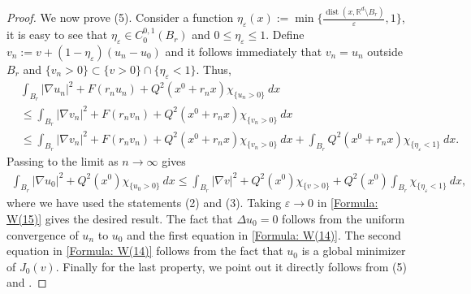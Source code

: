 \documentclass[11pt,reqno]{amsart}
\begin{document}
\begin{proof}
    We now prove (5). Consider a function $\eta_{\varepsilon}(x):=\min\{\frac{\operatorname{dist}(x,\mathbb{R}^{d}\setminus B_{r})}{\varepsilon},1\}$, it is easy to see that $\eta_{\varepsilon}\in C_{0}^{0,1}(B_{r})$ and $0\leqslant\eta_{\varepsilon}\leqslant1$. Define $v_{n}:=v+(1-\eta_{\varepsilon})(u_{n}-u_{0})$ and it follows immediately that $v_{n}=u_{n}$ outside $B_{r}$ and $\{v_{n}>0\}\subset\{v>0\}\cap\{\eta_{\varepsilon}<1\}$. Thus,
    \begin{align*}
    	&\int_{B_{r}}|\nabla u_{n}|^{2}+F(r_{n}u_{n})+Q^{2}(x^{0}+r_{n}x)\chi_{\{u_{n}>0\}}\:dx\\
    	&\leqslant\int_{B_{r}}|\nabla v_{n}|^{2}+F(r_{n}v_{n})+Q^{2}(x^{0}+r_{n}x)\chi_{\{v_{n}>0\}}\:dx\\
    	&\leqslant\int_{B_{r}}|\nabla v_{n}|^{2}+F(r_{n}v_{n})+Q^{2}(x^{0}+r_{n}x)\chi_{\{v_{n}>0\}}\:dx+\int_{B_{r}}Q^{2}(x^{0}+r_{n}x)\chi_{\{\eta_{\varepsilon}<1\}}\:dx.
    \end{align*}
    Passing to the limit as $n\to\infty$ gives
    \begin{align}\label{Formula: W(15)}
    	\int_{B_{r}}|\nabla u_{0}|^{2}+Q^{2}(x^{0})\chi_{\{u_{0}>0\}}\:dx\leqslant\int_{B_{r}}|\nabla v|^{2}+Q^{2}(x^{0})\chi_{\{v>0\}}+Q^{2}(x^{0})\int_{B_{r}}\chi_{\{\eta_{\varepsilon}<1\}}\:dx,
    \end{align}
    where we have used the statements (2) and (3). Taking $\varepsilon\to0$ in \eqref{Formula: W(15)} gives the desired result. The fact that $\Delta u_{0}=0$ follows from the uniform convergence of $u_{n}$ to $u_{0}$ and the first equation in \eqref{Formula: W(14)}. The second equation in \eqref{Formula: W(14)} follows from the fact that $u_{0}$ is a global minimizer of $J_{0}(v)$. Finally for the last property, we point out it directly follows from (5) and \cite[Lemma 3.7]{AC1981}.
\end{proof}
\end{document}
